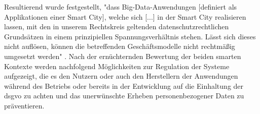 Resultierend wurde festgestellt, "dass Big-Data-Anwendungen [definiert als Applikationen einer Smart City], welche sich [...] in der Smart City realisieren lassen, mit den in unserem Rechtskreis geltenden datenschutzrechtlichen Grundsätzen in einem prinzipiellen Spannungsverhältnis stehen. Lässt sich dieses nicht auflösen, können die betreffenden Geschäftsmodelle nicht rechtmäßig umgesetzt werden" \cite[p.~45]{Sennhauser2019}. 
Nach der ernüchternden Bewertung der beiden smarten Kontexte werden nachfolgend Möglichkeiten zur Regulation der Systeme aufgezeigt, die es den Nutzern oder auch den Herstellern der Anwendungen während des Betriebs oder bereits in der Entwicklung auf die Einhaltung der \ac{dsgvo} zu achten und das unerwünschte Erheben personenbezogener Daten zu präventieren.
